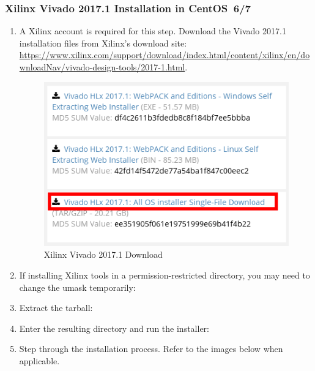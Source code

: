\begin{flushleft}
\begin{flushleft}
\subsubsection{Xilinx Vivado 2017.1 Installation in CentOS~6/7}
\label{sec:viv}
\begin{enumerate}
\item A Xilinx account is required for this step. Download the Vivado 2017.1 installation files from Xilinx's download site:
\url{https://www.xilinx.com/support/download/index.html/content/xilinx/en/downloadNav/vivado-design-tools/2017-1.html}.
\begin{figure}[ht]
	\centerline{\includegraphics[scale=0.6]{figures/xilinx_vivado_2017_download}}
	\caption{Xilinx Vivado 2017.1 Download}
\end{figure}
\item If installing Xilinx tools in a permission-restricted directory, you may need to change the umask temporarily:\newline
{}\newline
{}
\item Extract the tarball:\newline
{}
\item Enter the resulting directory and run the installer:\newline
{}\newline
{}\newline
\pagebreak
\item Step through the installation process. Refer to the images below when applicable.
\begin{figure}[H]

\end{figure}
\end{enumerate}
\end{flushleft}
\end{flushleft}
